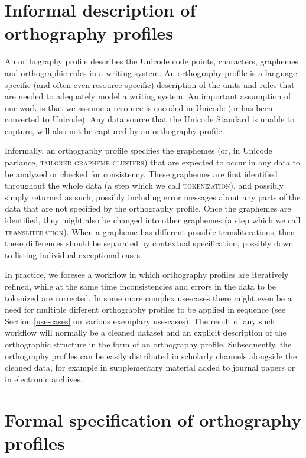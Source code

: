 \section{Informal description of orthography profiles}
\label{informal-description-of-orthography-profiles}

An orthography profile describes the Unicode code points, characters, graphemes and orthographic rules in a writing system. An orthography profile is a language-specific (and often even resource-specific) description of the units and rules that are needed to adequately model a writing system. An important assumption of our work is that we assume a resource is encoded in Unicode (or has been converted to Unicode). Any data source that the Unicode Standard is unable to capture, will also not be captured by an orthography profile.

Informally, an orthography profile specifies the graphemes (or, in Unicode parlance, \textsc{tailored grapheme clusters}) that are expected to occur in any data to be analyzed or checked for consistency. These graphemes are first identified throughout the whole data (a step which we call \textsc{tokenization}), and possibly simply returned as such, possibly including error messages about any parts of the data that are not specified by the orthography profile. Once the graphemes are identified, they might also be changed into other graphemes (a step which we call \textsc{transliteration}). When a grapheme has different possible transliterations, then these differences should be separated by contextual specification, possibly down to listing individual exceptional cases.

In practice, we foresee a workflow in which orthography profiles are iteratively refined, while at the same time inconsistencies and errors in the data to be tokenized are corrected. In some more complex use-cases there might even be a need for multiple different orthography profiles to be applied in sequence (see Section \ref{use-cases} on various exemplary use-cases). The result of any such workflow will normally be a cleaned dataset and an explicit description of the orthographic structure in the form of an orthography profile. Subsequently, the orthography profiles can be easily distributed in scholarly channels alongside the cleaned data, for example in supplementary material added to journal papers or in electronic archives.

\section{Formal specification of orthography profiles}
\label{formal-specification-of-orthography-profiles}

